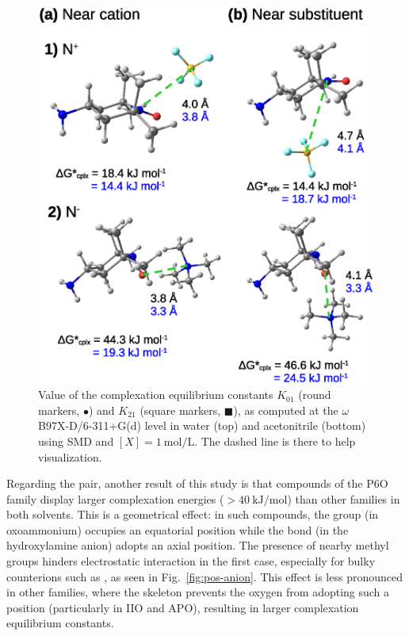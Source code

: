 \documentclass[review,preprint]{elsarticle}
\begin{document}
\begin{figure}[!h]
\centering
\includegraphics[width=\linewidth]{Figure13}
\caption{Value of the complexation equilibrium constants $K_{01}$ (round markers, $\bullet$) and $K_{21}$ (square markers, $\blacksquare$), as computed at the $\omega$B97X-D/6-311+G(d) level in water (top) and acetonitrile (bottom) using SMD and $[X]=\SI{1}{\mole\per\liter}$.  The dashed line is there to help visualization. }
\label{fig:Kx1}
\end{figure}


Regarding the  pair, another result of this study is that compounds of the P6O family display larger complexation energies ($>\SI{40}{\kilo\joule\per\mole}$) than other families in both solvents. This is a geometrical effect: in such compounds, the  group (in oxoammonium) occupies an equatorial position while the  bond (in the hydroxylamine anion) adopts an axial position. The presence of nearby methyl groups hinders electrostatic interaction in the first case, especially for bulky counterions such as , as seen in Fig.~\ref{fig:pos-anion}. This effect is less pronounced in other families, where the skeleton prevents the oxygen from adopting such a position (particularly in IIO and APO), resulting in larger complexation equilibrium constants.
\end{document}
